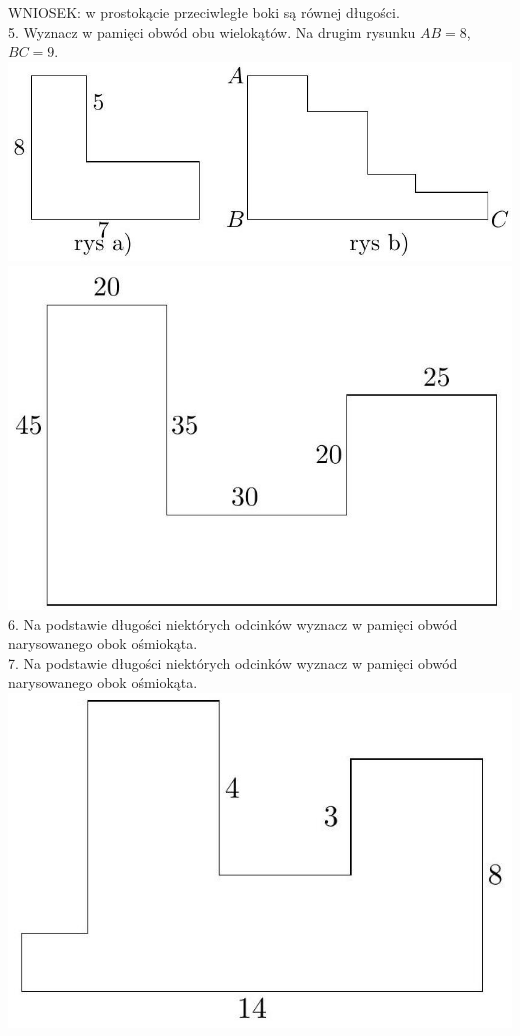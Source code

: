 \documentclass[10pt]{article}
\begin{document}
WNIOSEK: w prostokącie przeciwległe boki są równej długości.\\
5. Wyznacz w pamięci obwód obu wielokątów. Na drugim rysunku \(A B=8\), \(B C=9\).\\
\includegraphics[max width=\textwidth, center]{2024_11_21_71f62bd117d375398909g-010(1)}\\
\includegraphics[max width=\textwidth, center]{2024_11_21_71f62bd117d375398909g-011(1)}\\
6. Na podstawie długości niektórych odcinków wyznacz w pamięci obwód narysowanego obok ośmiokąta.\\
7. Na podstawie długości niektórych odcinków wyznacz w pamięci obwód narysowanego obok ośmiokąta.\\
\includegraphics[max width=\textwidth, center]{2024_11_21_71f62bd117d375398909g-011(2)}
\end{document}
